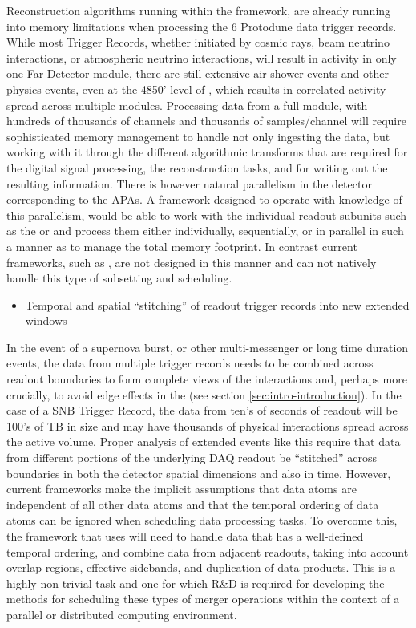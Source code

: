 \documentclass[../main-v1.tex]{subfiles}
\begin{document}
Reconstruction algorithms running within the  framework, are already running into memory limitations when processing the 6  Protodune data trigger records.  While most  Trigger Records, whether initiated by cosmic rays, beam neutrino interactions, or  atmospheric neutrino interactions, will result in activity in only one Far Detector module, there are still extensive air shower events and other physics events, even at the 4850' level of , which results in correlated activity spread across multiple modules.  Processing data from a full  module, with hundreds of thousands of channels and thousands of samples/channel will require sophisticated memory management to handle not only ingesting the data, but working with it through the different algorithmic transforms that are required for the digital signal processing, the reconstruction tasks, and for writing out the resulting information.  There is however natural parallelism in the  detector corresponding to the APAs.  A framework designed to operate with knowledge of this parallelism, would be able to work with the individual readout subunits such as the  or  and process them either individually, sequentially, or in parallel in such a manner as to manage the total memory footprint.  In contrast current frameworks, such as , are not designed in this manner and can not natively handle this type of subsetting and scheduling.

\begin{itemize}
\item Temporal and spatial ``stitching'' of readout trigger records into new extended windows
\end{itemize}

  In the event of a supernova burst, or other multi-messenger or long time duration events, the data from multiple trigger records needs to be combined across readout boundaries to form complete views of the interactions
  and, perhaps more crucially, to avoid edge effects in the  (see section \ref{sec:intro-introduction}).  In the case of a SNB Trigger Record, the data from ten's of seconds of readout will be 100's of TB in size and may have thousands of physical interactions spread across the active volume.  Proper analysis of extended events like this require that data from different portions of the underlying DAQ readout be ``stitched'' across boundaries in both the detector spatial dimensions and also in time.  However, current  frameworks make the implicit assumptions that data atoms are independent of all other data atoms and that the temporal ordering of data atoms can be ignored when scheduling data processing tasks.  To overcome this, the framework that  uses will need to handle data that has a well-defined temporal ordering, and combine data from adjacent readouts, taking into account overlap regions, effective sidebands, and duplication of data products.  This is a highly non-trivial task and one for which R\&D is required for developing the methods for scheduling these types of merger operations within the context of a parallel or distributed computing environment.
\end{document}
